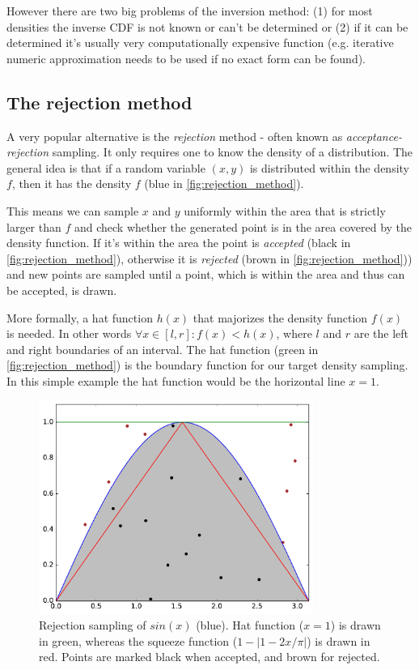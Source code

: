 However there are two big problems of the inversion method: (1) for most densities the inverse CDF is not known or can't be determined or (2) if it can be determined it's usually very computationally expensive function (e.g. iterative numeric approximation needs to be used if no exact form can be found).

\subsection{The rejection method}
\label{subsection:rejection}

A very popular alternative is the \textit{rejection} method - often known as \textit{acceptance-rejection} sampling. It only requires one to know the density of a distribution. The general idea is that if a random variable $(x, y)$ is distributed within the density $f$, then it has the density $f$ (blue in \autoref{fig:rejection_method}).

This means we can sample $x$ and $y$ uniformly within the area that is strictly larger than $f$ and check whether the generated point is in the area covered by the density function. If it's within the area the point is \textit{accepted} (black in \autoref{fig:rejection_method}), otherwise it is \textit{rejected} (brown in \autoref{fig:rejection_method})) and new points are sampled until a point, which is within the area and thus can be accepted, is drawn.

More formally, a hat function $h(x)$ that majorizes the density function $f(x)$ is needed. In other words $ \forall x \in [l, r]: f(x) < h(x)$, where $l$ and $r$ are the left and right boundaries of an interval.
The hat function (green in \autoref{fig:rejection_method}) is the boundary function for our target density sampling. In this simple example the hat function would be the horizontal line $x = 1$.

\begin{figure}[h!]
\centering
\includegraphics[width=0.8\textwidth]{figs/rejection_sampling.pdf}
\caption{Rejection sampling of $sin(x)$ (blue). Hat function ($x = 1$) is drawn in green, whereas the squeeze function ($1 - |1 - 2x / \pi |$) is drawn in red. Points are marked black when accepted, and brown for rejected.}
\label{fig:rejection_method}
\end{figure}

